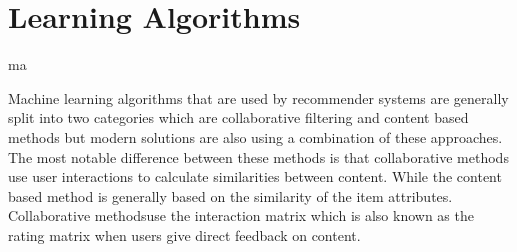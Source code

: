 \section{Learning Algorithms}
ma

Machine learning algorithms that are used by recommender systems are generally split into two categories which are collaborative filtering and content based methods but modern solutions are also using a combination of these approaches. The most notable difference between these methods is that collaborative methods use user interactions to calculate similarities between content. While the content based method is generally based on the similarity of the item attributes. Collaborative methodsuse the interaction matrix which is also known as the rating matrix when users give direct feedback on content. 



